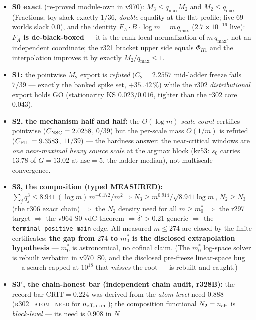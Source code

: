 \documentclass[11pt]{article}
\theoremstyle{definition}
\theoremstyle{remark}
\begin{document}
\begin{itemize}[leftmargin=2em]
\item \textbf{S0 exact} (re-proved module-own in v970): $M_3 \le
q_{\max} M_2$ and $M_2 \le q_{\max}$ (Fractions; toy slack exactly
$1/36$, \emph{double} equality at the flat profile; live 69 worlds
slack $0.0$), and the identity $F_A \cdot B \cdot \log m =
m\,q_{\max}$ ($2.7\times10^{-16}$ live): \textbf{$F_A$ is
de-black-boxed} --- it is the rank-local normalization of
$m\,q_{\max}$, not an independent coordinate; the r321 bracket
upper side equals $\Phi_{H1}$ and the interpolation improves it by
exactly $M_2/q_{\max} \le 1$.
\item \textbf{S1:} the pointwise $M_2$ export is \emph{refuted}
($C_2 = 2.2557$ mid-ladder freeze fails $7/39$ --- exactly the
banked spike set, $+35$..$42\,\%$) while the r302
\emph{distributional} export holds GO (stationarity KS
$0.023/0.016$, tighter than the r302 core $0.043$).
\item \textbf{S2, the mechanism half and half:} the $O(\log m)$
\emph{scale count} certifies pointwise ($C_{\rm NSC} = 2.0258$,
$0/39$) but the per-scale mass $O(1/m)$ is refuted ($C_{\rm PIL} =
9.3583$, $11/39$) --- the hardness answer: the near-critical
windows are \emph{one near-maximal heavy source scale} at the
argmax block (kz53: $s_0$ carries $13.78$ of $G = 13.02$ at
$\mathrm{nsc} = 5$, the ladder median), not multiscale convergence.
\item \textbf{S3, the composition (typed MEASURED):}
$\sum_j q_j^3 \le 8.941\,(\log m)\, m^{+0.172}/m^2 \Rightarrow
N_3 \ge m^{0.914}/\sqrt{8.941 \log m}$, $N_2 \ge N_3$ (the r306
exact chain) $\Rightarrow$ the $N_2$ density need for all $m \ge
m_0^*$ $\Rightarrow$ the r297 target $\Rightarrow$ the v964-S0 vdC
theorem $\Rightarrow \delta' > 0.21$ generic $\Rightarrow$ the
\texttt{terminal\_positive\_main} edge.  All measured $m \le 274$
are closed by the finite certificates; \textbf{the gap from $274$
to $m_0^*$ is the disclosed extrapolation hypothesis} --- $m_0^*$
is astronomical, no cofinal claim.  (The $m_0^*$ log-space solver
is rebuilt verbatim in v970~S0, and the disclosed pre-freeze
linear-space bug --- a search capped at $10^{18}$ that
\emph{misses} the root --- is rebuilt and caught.)
\item \textbf{S3$'$, the chain-honest bar (independent chain
audit, r328B):} the record bar $\mathrm{CRIT} = 0.224$ was derived
from the \emph{atom-level} need $0.888$ (\textsc{r302\_atom\_need}
for $n_{\rm eff,atom}$); the composition functional $N_2 =
n_{\rm eff}$ is \emph{block-level} --- its need is $0.908$ in $N$

\end{itemize}
\end{document}
